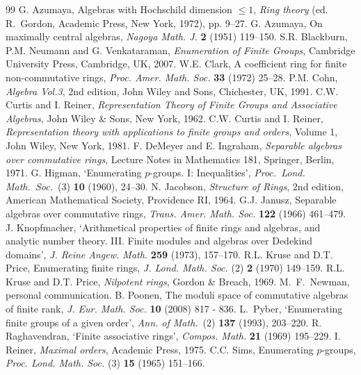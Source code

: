 \documentclass[12pt]{article}
\begin{document}
\begin{thebibliography}{99} 
 G. Azumaya, Algebras with Hochschild dimension $\leq 1$, \textit{Ring theory} (ed. R.~Gordon, Academic Press, New York, 1972), pp. 9--27.
 G. Azumaya, On maximally central algebras, \textit{Nagoya Math. J.} \textbf{2} (1951) 119--150.
 S.R. Blackburn, P.M. Neumann and G. Venkataraman, \emph{Enumeration of Finite Groups}, Cambridge University Press, Cambridge, UK, 2007.
 W.E. Clark, A coefficient ring for finite non-commutative rings, \textit{Proc. Amer. Math. Soc.} \textbf{33} (1972) 25--28.
 P.M. Cohn, \emph{Algebra Vol.3}, 2nd edition, John Wiley and Sons, Chichester, UK, 1991.
 C.W. Curtis and I. Reiner, \emph{Representation Theory of Finite Groups and Associative Algebras}, John Wiley \& Sons, New York, 1962.
 C.W. Curtis and I. Reiner, \textit{Representation theory with applications to finite groups and orders}, Volume 1, John Wiley, New York, 1981. 
 F. DeMeyer and E. Ingraham, \textit{Separable algebras over commutative rings}, Lecture Notes in Mathematics 181, Springer, Berlin, 1971. 
 G. Higman,
 `Enumerating $p$-groups. I: Inequalities',
 {\em Proc.\ Lond. Math.\ Soc.}\ (3) {\bf 10} (1960), 24--30.
 N. Jacobson, \emph{Structure of Rings}, 2nd edition, American Mathematical Society, Providence RI, 1964.
 G.J. Janusz, Separable algebras over commutative rings, \textit{Trans. Amer. Math. Soc.} \textbf{122} (1966) 461--479.
 J. Knopfmacher, `Arithmetical properties of finite rings and algebras, and analytic number theory. III. Finite modules and algebras over Dedekind domains', \emph{J. Reine Angew. Math.} \textbf{259} (1973), 157--170.
 R.L. Kruse and D.T. Price, Enumerating finite rings, \textit{J. Lond. Math. Soc.} (2) \textbf{2} (1970) 149--159.
 R.L. Kruse and D.T. Price, \textit{Nilpotent rings}, Gordon \& Breach, 1969.
 M.\ F.\ Newman, personal communication.
 B. Poonen, The moduli space of commutative algebras of finite rank, \textit{J. Eur. Math. Soc.} \textbf{10} (2008) 817 - 836.
 L.\ Pyber,
 `Enumerating finite groups of a given order',
 {\em Ann. of Math.}\ (2) {\bf 137} (1993), 203--220.
  R. Raghavendran, `Finite associative rings', \textit{Compos. Math.} \textbf{21} (1969) 195--229.
 I. Reiner, \textit{Maximal orders}, Academic Press, 1975.
 C.C. Sims, Enumerating $p$-groups, \textit{Proc. Lond. Math. Soc.} (3) \textbf{15} (1965) 151--166.
\end{thebibliography}
\end{document}
